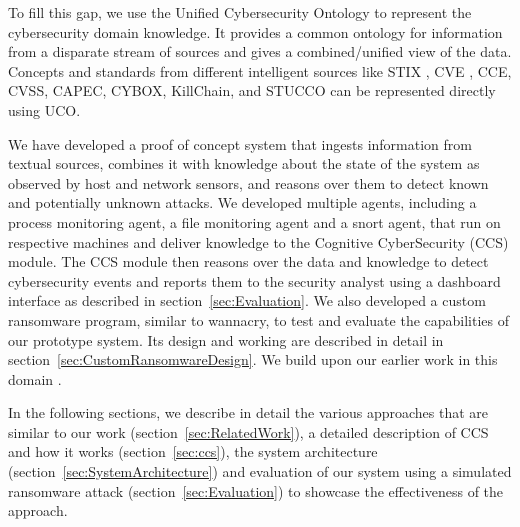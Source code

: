 To fill this gap, we use the Unified Cybersecurity Ontology \cite{syed2016uco} to represent the cybersecurity domain knowledge. It provides a common ontology for information from a disparate stream of sources and gives a combined/unified view of the data. Concepts and standards from different intelligent sources like STIX \cite{barnum2012standardizing}, CVE \cite{mell2002use}, CCE, CVSS, CAPEC, CYBOX, KillChain, and STUCCO can be represented directly using UCO. 

We have developed a proof of concept system that ingests information from textual sources, combines it with knowledge about the state of the system as observed by host and network sensors, and reasons over them to detect known and potentially unknown attacks. We developed multiple agents, including a process monitoring agent, a file monitoring agent and a snort agent, that run on respective machines and deliver knowledge to the Cognitive CyberSecurity (CCS) module. The CCS module then reasons over the data and knowledge to detect cybersecurity events and reports them to the security analyst using a dashboard interface as described in section~\ref{sec:Evaluation}. We also developed a custom ransomware program, similar to wannacry, to test and evaluate the capabilities of our prototype system. Its design and working are described in detail in section~\ref{sec:CustomRansomwareDesign}. We build upon our earlier work in this domain \cite{more2012knowledge}.

In the following sections, we describe in detail the various approaches that are similar to our work (section~\ref{sec:RelatedWork}), a detailed description of CCS and how it works (section~\ref{sec:ccs}), the system architecture (section~\ref{sec:SystemArchitecture}) and evaluation of our system using a simulated ransomware attack (section~\ref{sec:Evaluation}) to showcase the effectiveness of the approach.